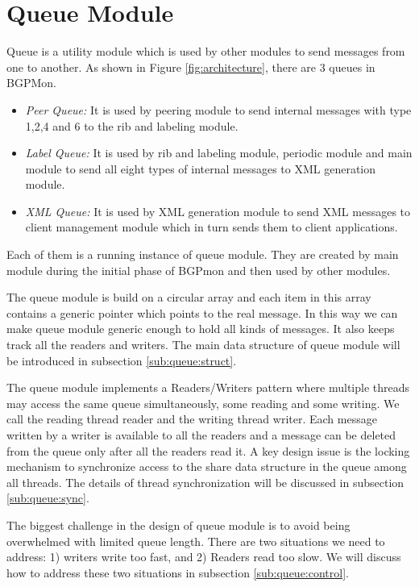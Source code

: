 \section{Queue Module}
\label{sec:queue}
Queue is a utility module which is used by other modules to send messages from one to another. As shown in Figure \ref{fig:architecture}, there are 3 queues in BGPMon.
\begin{itemize}
	\item{\emph{ Peer Queue:} It is used by peering module to send internal messages with type 1,2,4 and 6 to the rib and labeling module.}
	\item{\emph{ Label Queue:} It is used by rib and labeling module, periodic module and main module to send all eight types of internal messages to XML generation module. }
	\item{\emph{ XML Queue:} It is used by XML generation module to send XML messages to client management module which in turn sends them to client applications.}
\end{itemize} 
Each of them is a running instance of queue module. They are created by main module during the initial phase of BGPmon and then used by other modules.

The queue module is build on a circular array and each item in this array contains a generic pointer which points to the real message. In this way we can make queue module generic enough to hold all kinds of messages. It also keeps track all the readers and writers. The main data structure of queue module will be introduced in subsection \ref{sub:queue:struct}.

The queue module implements a Readers/Writers pattern where multiple threads may access the same queue simultaneously, some reading and some writing. We call the reading thread reader and the writing thread writer. Each message written by a writer is available to all the readers and a message can be deleted from the queue only after all the readers read it. A key design issue is the locking mechanism to synchronize access to the share data structure in the queue among all threads.  The details of thread synchronization will be discussed in subsection 
\ref{sub:queue:sync}.
 
The biggest challenge in the design of queue module is to avoid being overwhelmed with limited queue length.  There are two situations we need to address: 1) writers write too fast, and 2) Readers read too slow. We will discuss how to address these two situations in subsection \ref{sub:queue:control}.
 

